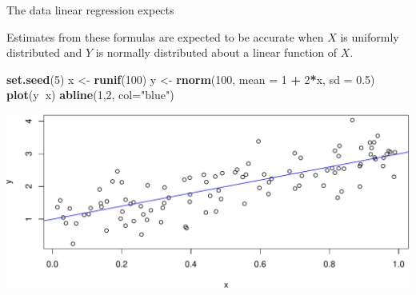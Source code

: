 \documentclass[
  ignorenonframetext,
]{beamer}
\newenvironment{Shaded}{\begin{snugshade}}{\end{snugshade}}
\newcommand{\DataTypeTok}[1]{\textcolor[rgb]{0.13,0.29,0.53}{#1}}
\newcommand{\DecValTok}[1]{\textcolor[rgb]{0.00,0.00,0.81}{#1}}
\newcommand{\FloatTok}[1]{\textcolor[rgb]{0.00,0.00,0.81}{#1}}
\newcommand{\KeywordTok}[1]{\textcolor[rgb]{0.13,0.29,0.53}{\textbf{#1}}}
\newcommand{\NormalTok}[1]{#1}
\newcommand{\OperatorTok}[1]{\textcolor[rgb]{0.81,0.36,0.00}{\textbf{#1}}}
\newcommand{\StringTok}[1]{\textcolor[rgb]{0.31,0.60,0.02}{#1}}
\begin{document}
\begin{frame}[fragile]{The data linear regression expects}
\protect\hypertarget{the-data-linear-regression-expects}{}

Estimates from these formulas are expected to be accurate when \(X\) is
uniformly distributed and \(Y\) is normally distributed about a linear
function of \(X\). \scriptsize

\begin{Shaded}
\begin{Highlighting}[]
\KeywordTok{set.seed}\NormalTok{(}\DecValTok{5}\NormalTok{)}
\NormalTok{x <-}\StringTok{ }\KeywordTok{runif}\NormalTok{(}\DecValTok{100}\NormalTok{)}
\NormalTok{y <-}\StringTok{ }\KeywordTok{rnorm}\NormalTok{(}\DecValTok{100}\NormalTok{, }\DataTypeTok{mean =} \DecValTok{1} \OperatorTok{+}\StringTok{ }\DecValTok{2}\OperatorTok{*}\NormalTok{x, }\DataTypeTok{sd =} \FloatTok{0.5}\NormalTok{)}
\KeywordTok{plot}\NormalTok{(y}\OperatorTok{~}\NormalTok{x)}
\KeywordTok{abline}\NormalTok{(}\DecValTok{1}\NormalTok{,}\DecValTok{2}\NormalTok{, }\DataTypeTok{col=}\StringTok{"blue"}\NormalTok{)}
\end{Highlighting}
\end{Shaded}

\includegraphics{Regression_and_ANOVA_files/figure-beamer/unnamed-chunk-2-1.pdf}

\end{frame}
\end{document}
